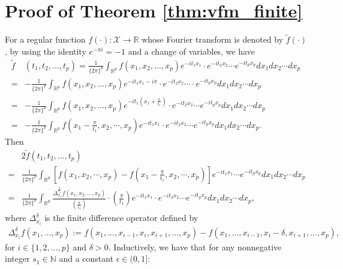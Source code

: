 \documentclass[11pt]{article}
\numberwithin{equation}{section}
\begin{document}
\section{Proof of Theorem \ref{thm:vfm_finite}}\label{appendix_ANN_approx}
For a regular function $f(\cdot):\mathcal{X}\to \mathbb{R}$ whose Fourier transform is denoted by $\widetilde{f}(\cdot)$, by using the identity $e^{-\pi i}=-1$ and a change of variables, we have
\begin{align*}
	\widetilde{f}&(t_1,t_2,...,t_p)=\frac{1}{\{2\pi\}^{p}}\int_{\mathbb{R}^p}f(x_1,x_2,...,x_p)e^{-it_1x_1}\cdot e^{-it_2x_2}\cdots e^{-it_px_p}dx_1dx_2\cdots dx_p\\
	=&-\frac{1}{\{2\pi\}^{p}}\int_{\mathbb{R}^p}f(x_1,x_2,...,x_p)e^{-it_1x_1-i\pi}\cdot e^{-it_2x_2}\cdots \cdot e^{-it_px_p}dx_1dx_2\cdots dx_p\\
	=&-\frac{1}{\{2\pi\}^{p}}\int_{\mathbb{R}^p}f(x_1,x_2,...,x_p)e^{-it_1(x_1+\frac{\pi}{t_1})}\cdot e^{-it_2 x_2}\cdots e^{-it_px_p}dx_1dx_2\cdots dx_p\\
	=&-\frac{1}{\{2\pi\}^{p}}\int_{\mathbb{R}^p}f\left(x_1-\frac{\pi}{t_1},x_2,\cdots,x_p\right)e^{-it_1x_1}\cdot e^{-it_2x_2}\cdots e^{-it_px_p}dx_1dx_2\cdots dx_p.
\end{align*}
Then
\begin{align*}
	&2\widetilde{f}(t_1,t_2,...,t_p)\\
	=&\frac{1}{\{2\pi\}^{p}}\int_{\mathbb{R}^p}\left[f(x_1,x_2,\cdots,x_p)-f\left(x_1-\frac{\pi}{t_1},x_2,\cdots,x_p\right)\right]e^{-it_1x_1}\cdots  e^{-it_px_p}dx_1dx_2\cdots dx_p\\
	=&\frac{1}{\{2\pi\}^{p}}\int_{\mathbb{R}^p}\frac{\Delta_{x_1}^{\frac{\pi}{t_1}}f\left(x_1,x_2,...,x_p\right)}{\left(\frac{\pi}{t_1}\right)} \cdot \left(\frac{\pi}{t_1}\right) e^{-it_1x_1}\cdot e^{-it_2x_2}\cdots e^{-it_px_p}dx_1dx_2\cdots dx_p,
\end{align*}	
where $\Delta_{x_i}^{\delta}$ is the finite difference operator defined by
\begin{align*}
	\Delta_{x_i}^{\delta}f\left(x_1,...,x_p\right):=f\left(x_1,...,x_{i-1},x_i,x_{i+1},...,x_p\right)-f\left(x_1,...,x_{i-1},x_i-\delta,x_{i+1},...,x_p\right),
\end{align*}
for $i\in\{1,2,...,p\}$ and $\delta>0$.
Inductively, we have that for any nonnegative integer $s_1\in\mathbb{N}$ and a constant $\epsilon\in(0,1]$:
\end{document}
